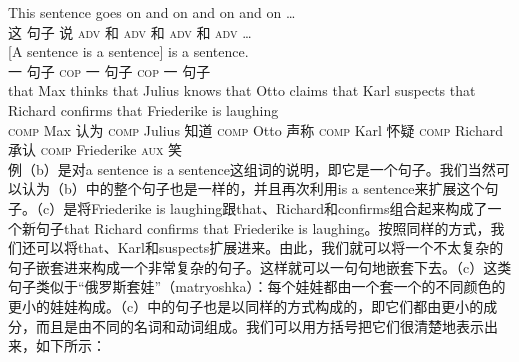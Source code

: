 \eal 
\ex 
\gll This sentence goes on and on and on and on \ldots \\
       这 句子 说 \textsc{adv} 和 \textsc{adv} 和 \textsc{adv} 和 \textsc{adv} \ldots \\
\ex
\gll  {}[A sentence is a sentence] is a sentence. \\
      {}一 句子 \textsc{cop} 一 句子 \textsc{cop} 一 句子\\
\ex\label{einbettung-dass-Saetze}
\gll that Max thinks that Julius knows that Otto claims that Karl suspects that Richard confirms that Friederike is laughing\\
      \textsc{comp} Max 认为 \textsc{comp} Julius 知道 \textsc{comp} Otto 声称 \textsc{comp} Karl 怀疑 \textsc{comp} Richard 承认 \textsc{comp} Friederike \textsc{aux} 笑\\
\zl
\noindent
例（b）是对a sentence is a sentence这组词的说明，即它是一个句子。我们当然可以认为（b）中的整个句子也是一样的，并且再次利用is a sentence来扩展这个句子。（c）是将Friederike is laughing跟that、Richard和confirms组合起来构成了一个新句子that Richard confirms that Friederike is laughing。按照同样的方式，我们还可以将that、Karl和suspects扩展进来。由此，我们就可以将一个不太复杂的句子嵌套进来构成一个非常复杂的句子。这样就可以一句句地嵌套下去。（c）这类句子类似于“俄罗斯套娃”（matryoshka）：每个娃娃都由一个套一个的不同颜色的更小的娃娃构成。（c）中的句子也是以同样的方式构成的，即它们都由更小的成分，而且是由不同的名词和动词组成。我们可以用方括号把它们很清楚地表示出来，如下所示：

